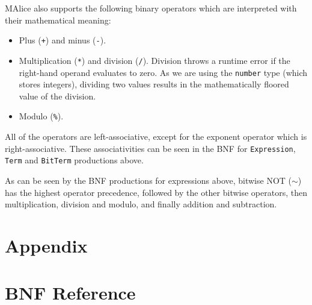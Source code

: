 \documentclass[a4wide, 11pt]{article}
\begin{document}
MAlice also supports the following binary operators which are interpreted with their mathematical meaning:

\begin{itemize}

\item Plus (\texttt{+}) and minus (\texttt{-}).
\item Multiplication (\texttt{*}) and division (\texttt{/}). Division throws a runtime error if the right-hand operand evaluates to zero. As we are using the \texttt{number} type (which stores integers), dividing two values results in the mathematically floored value of the division.
\item Modulo (\texttt{\%}).

\end{itemize}

All of the operators are left-associative, except for the exponent operator which is right-associative. These associativities can be seen in the BNF for \texttt{Expression}, \texttt{Term} and \texttt{BitTerm} productions above.

As can be seen by the BNF productions for expressions above, bitwise NOT ($\sim$) has the highest operator precedence, followed by the other bitwise operators, then multiplication, division and modulo, and finally addition and subtraction.

\newpage	
\section{Appendix}
\appendix

\section{BNF Reference}
\end{document}
